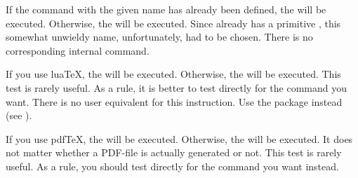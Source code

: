 \begin{Declaration}
\end{Declaration}
If the command with the given name has already been defined, the  will be executed. Otherwise, the  will be executed.
Since \eTeX{} already has a primitive , this somewhat
unwieldy name, unfortunately, had to be chosen. There is no corresponding
internal command.%
\EndIndexGroup


\begin{Declaration}
\end{Declaration}
If you use lua\TeX{}, the  will be executed. Otherwise, the  will be executed.
\iftrue%
This test is rarely useful. %
\fi%
As a rule, it is better to test directly for the command you want.
There is no user equivalent for this instruction. Use the
 package instead (see
\cite{package:ifluatex}).%
\EndIndexGroup


\iffalse%
\begin{Declaration}
  \Macro{scr@ifpdforluatex}
  \Parameter{then code}\Parameter{else code}
\end{Declaration}
Until lua\TeX~0.85, it was mostly irrelevant whether you used pdf\TeX{} or
lua\TeX{}. This command, which executes the \PName{then code} in both cases,
derives from that fact. If neither pdf\TeX{} nor lua\TeX{} is used, the
\PName{else code} will be executed. Since version~0.85, lua\TeX{} has given up
compatibility with many of its commands. Therefore this distinction is no
longer useful in practice and is no longer used by \KOMAScript{} itself. There
is no user equivalent of this statement.%
\EndIndexGroup
\fi

\begin{Declaration}
\end{Declaration}
If you use pdf\TeX{}, the  will be executed. Otherwise, the
 will be executed. It does not matter whether a PDF-file is
actually generated or not. This test is rarely useful. As a rule, you should
test directly for the command you want instead.%
\EndIndexGroup


